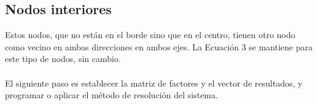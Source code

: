 \documentclass[12pt, notitlepage]{article}
\begin{document}
\subsection{Nodos interiores}
Estos nodos, que no están en el borde sino que en el centro, tienen otro nodo como vecino en ambas direcciones en ambos ejes. La Ecuación 3 se mantiene para este tipo de nodos, sin cambio.\\\\
El siguiente paso es establecer la matriz de factores y el vector de resultados, y programar o aplicar el método de resolución del sistema.
\end{document}
